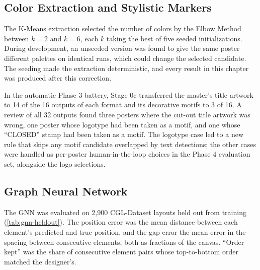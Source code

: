 \begin{refsection}
\subsection{Color Extraction and Stylistic Markers}

The K-Means extraction selected the number of colors by the Elbow Method between $k = 2$ and $k = 6$, each $k$ taking the best of five seeded initializations. During development, an unseeded version was found to give the same poster different palettes on identical runs, which could change the selected candidate. The seeding made the extraction deterministic, and every result in this chapter was produced after this correction.

In the automatic Phase 3 battery, Stage 0c transferred the master's title artwork to 14 of the 16 outputs of each format and its decorative motifs to 3 of 16. A review of all 32 outputs found three posters where the cut-out title artwork was wrong, one poster whose logotype had been taken as a motif, and one whose ``CLOSED'' stamp had been taken as a motif. The logotype case led to a new rule that skips any motif candidate overlapped by text detections; the other cases were handled as per-poster human-in-the-loop choices in the Phase 4 evaluation set, alongside the logo selections.

\subsection{Graph Neural Network}

The GNN was evaluated on 2,900 CGL-Dataset layouts held out from training (\ref{tab:gnn-heldout}). The position error was the mean distance between each element's predicted and true position, and the gap error the mean error in the spacing between consecutive elements, both as fractions of the canvas. ``Order kept'' was the share of consecutive element pairs whose top-to-bottom order matched the designer's.


\end{refsection}

